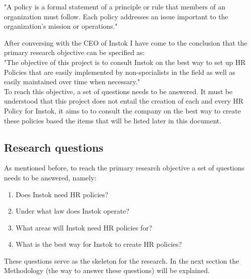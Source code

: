 \documentclass[man]{apa6}
\begin{document}
\begin{displayquote}
"A policy is a formal statement of a principle or rule that members of an organization must follow. Each policy addresses an issue important to the organization's mission or operations."
\end{displayquote}

After conversing with the CEO of Instok I have come to the conclusion that the primary research objective can be specified as:\\
"The objective of this project is to consult Instok on the best way to set up HR Policies that are easily implemented by non-specialists in the field as well as easily maintained over time when necessary."\\
To reach this objective, a set of questions needs to be answered. It must be understood that this project does not entail the creation of each and every HR Policy for Instok, it aims to to consult the company on the best way to create these policies based the items that will be listed later in this document. 

\subsection{Research questions}
As mentioned before, to reach the primary research objective a set of questions needs to be answered, namely:
\begin{enumerate}
\item Does Instok need HR policies?
\item Under what law does Instok operate?
\item What areas will Instok need HR policies for?
\item What is the best way for Instok to create HR policies?
\end{enumerate}

These questions serve as the skeleton for the research. In the next section the Methodology (the way to answer these questions) will be explained.

\end{document}
